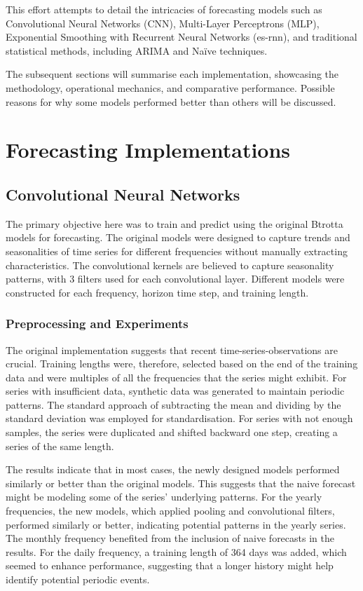 \documentclass[conference]{IEEEtran}
\begin{document}
This effort attempts to detail the intricacies of forecasting models such as Convolutional Neural Networks (CNN), Multi-Layer Perceptrons (MLP), Exponential Smoothing with Recurrent Neural Networks (es-rnn), and traditional statistical methods, including ARIMA and Naïve techniques.

The subsequent sections will summarise each implementation, showcasing the methodology, operational mechanics, and comparative performance. Possible reasons for why some models performed better than others will be discussed.

\section{Forecasting Implementations}

\subsection{Convolutional Neural Networks}

The primary objective here was to train and predict using the original Btrotta models\cite{cnn} for forecasting. The original models were designed to capture trends and seasonalities of time series for different frequencies without manually extracting characteristics. The convolutional kernels are believed to capture seasonality patterns, with 3 filters used for each convolutional layer. Different models were constructed for each frequency, horizon time step, and training length.

\subsubsection{Preprocessing and Experiments}

The original implementation suggests that recent time-series-observations are crucial. Training lengths were, therefore, selected based on the end of the training data and were multiples of all the frequencies that the series might exhibit. For series with insufficient data, synthetic data was generated to maintain periodic patterns. The standard approach of subtracting the mean and dividing by the standard deviation was employed for standardisation. For series with not enough samples, the series were duplicated and shifted backward one step, creating a series of the same length.

The results indicate that in most cases, the newly designed models performed similarly or better than the original models. This suggests that the naive forecast might be modeling some of the series' underlying patterns. For the yearly frequencies, the new models, which applied pooling and convolutional filters, performed similarly or better, indicating potential patterns in the yearly series. The monthly frequency benefited from the inclusion of naive forecasts in the results. For the daily frequency, a training length of 364 days was added, which seemed to enhance performance, suggesting that a longer history might help identify potential periodic events.
\end{document}
